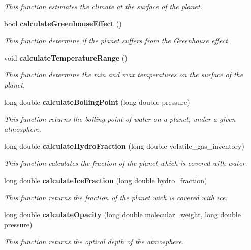 \begin{CompactItemize}
\begin{CompactList}\small\item\em This function estimates the climate at the surface of the planet. \item\end{CompactList}\item 
bool {\bf calculate\-Greenhouse\-Effect} ()
\begin{CompactList}\small\item\em This function determine if the planet suffers from the Greenhouse effect. \item\end{CompactList}\item 
void {\bf calculate\-Temperature\-Range} ()\label{class_s_g___planet_b16}

\begin{CompactList}\small\item\em This function determine the min and max temperatures on the surface of the planet. \item\end{CompactList}\item 
long double {\bf calculate\-Boiling\-Point} (long double pressure)
\begin{CompactList}\small\item\em This function returns the boiling point of water on a planet, under a given atmosphere. \item\end{CompactList}\item 
long double {\bf calculate\-Hydro\-Fraction} (long double volatile\_\-gas\_\-inventory)
\begin{CompactList}\small\item\em This function calculates the fraction of the planet which is covered with water. \item\end{CompactList}\item 
long double {\bf calculate\-Ice\-Fraction} (long double hydro\_\-fraction)
\begin{CompactList}\small\item\em This function returns the fraction of the planet wich is covered with ice. \item\end{CompactList}\item 
long double {\bf calculate\-Opacity} (long double molecular\_\-weight, long double pressure)
\begin{CompactList}\small\item\em This function returns the optical depth of the atmosphere. \item\end{CompactList}\item 

\end{CompactItemize}
